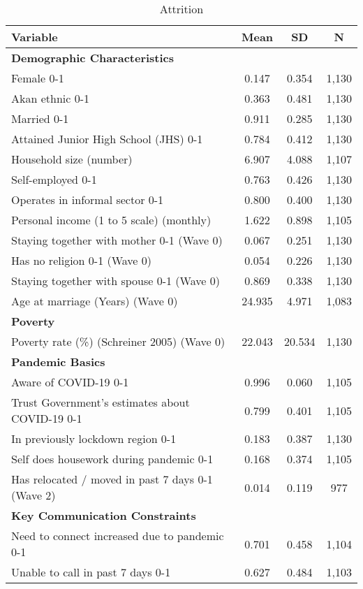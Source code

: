 \begin{ThreePartTable}
\begin{table}[tbp]\centering
\def\sym#1{\ifmmode^{#1}\else\(^{#1}\)\fi}
\caption{Attrition}
\begin{tabular}{lccc}
\hline
Variable & Mean & SD & N \\
\hline\hline
\textbf{Demographic Characteristics} & & & \\ 
Female 0-1 & 0.147 & 0.354 & 1,130 \\ 
Akan ethnic 0-1 & 0.363 & 0.481 & 1,130 \\ 
Married 0-1 & 0.911 & 0.285 & 1,130 \\ 
Attained Junior High School (JHS) 0-1 & 0.784 & 0.412 & 1,130 \\ 
Household size (number) & 6.907 & 4.088 & 1,107 \\ 
Self-employed 0-1 & 0.763 & 0.426 & 1,130 \\ 
Operates in informal sector 0-1 & 0.800 & 0.400 & 1,130 \\ 
Personal income (1 to 5 scale) (monthly) & 1.622 & 0.898 & 1,105 \\ 
Staying together with mother 0-1 (Wave 0) & 0.067 & 0.251 & 1,130 \\ 
Has no religion 0-1 (Wave 0) & 0.054 & 0.226 & 1,130 \\ 
Staying together with spouse 0-1 (Wave 0) & 0.869 & 0.338 & 1,130 \\ 
Age at marriage (Years) (Wave 0) & 24.935 & 4.971 & 1,083 \\ 
\textbf{Poverty} & & & \\ 
Poverty rate (\%) (Schreiner 2005) (Wave 0) & 22.043 & 20.534 & 1,130 \\ 
\textbf{Pandemic Basics} & & & \\ 
Aware of COVID-19 0-1 & 0.996 & 0.060 & 1,105 \\ 
Trust Government's estimates about COVID-19 0-1 & 0.799 & 0.401 & 1,105 \\ 
In previously lockdown region 0-1 & 0.183 & 0.387 & 1,130 \\ 
Self does housework during pandemic 0-1 & 0.168 & 0.374 & 1,105 \\ 
Has relocated / moved in past 7 days 0-1 (Wave 2) & 0.014 & 0.119 & 977 \\ 
\textbf{Key Communication Constraints} & & & \\ 
Need to connect increased due to pandemic 0-1 & 0.701 & 0.458 & 1,104 \\ 
Unable to call in past 7 days 0-1 & 0.627 & 0.484 & 1,103 \\ 

\end{tabular}
\end{table}
\end{ThreePartTable}
